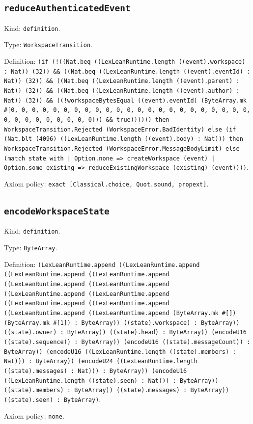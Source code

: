 \documentclass[11pt]{article}
\begin{document}
\subsection*{\texttt{reduceAuthenticatedEvent}}
\noindent Kind: \texttt{definition}.\par
\noindent Type: \texttt{WorkspaceTransition}.\par
\noindent Definition: \texttt{(if (!((Nat.beq ((LexLeanRuntime.length ((event).workspace) : Nat)) (32)) \&\& ((Nat.beq ((LexLeanRuntime.length ((event).eventId) : Nat)) (32)) \&\& ((Nat.beq ((LexLeanRuntime.length ((event).parent) : Nat)) (32)) \&\& ((Nat.beq ((LexLeanRuntime.length ((event).author) : Nat)) (32)) \&\& ((!workspaceBytesEqual ((event).eventId) (ByteArray.mk \#[0, 0, 0, 0, 0, 0, 0, 0, 0, 0, 0, 0, 0, 0, 0, 0, 0, 0, 0, 0, 0, 0, 0, 0, 0, 0, 0, 0, 0, 0, 0, 0])) \&\& true)))))) then WorkspaceTransition.Rejected (WorkspaceError.BadIdentity) else (if (Nat.blt (4096) ((LexLeanRuntime.length ((event).body) : Nat))) then WorkspaceTransition.Rejected (WorkspaceError.MessageBodyLimit) else (match state with | Option.none => createWorkspace (event) | Option.some existing => reduceExistingWorkspace (existing) (event))))}.\par
\noindent Axiom policy: \texttt{exact [Classical.choice, Quot.sound, propext]}.\par
\subsection*{\texttt{encodeWorkspaceState}}
\noindent Kind: \texttt{definition}.\par
\noindent Type: \texttt{ByteArray}.\par
\noindent Definition: \texttt{(LexLeanRuntime.append ((LexLeanRuntime.append ((LexLeanRuntime.append ((LexLeanRuntime.append ((LexLeanRuntime.append ((LexLeanRuntime.append ((LexLeanRuntime.append ((LexLeanRuntime.append ((LexLeanRuntime.append ((LexLeanRuntime.append ((LexLeanRuntime.append ((LexLeanRuntime.append (ByteArray.mk \#[]) (ByteArray.mk \#[1]) : ByteArray)) ((state).workspace) : ByteArray)) ((state).owner) : ByteArray)) ((state).head) : ByteArray)) (encodeU16 ((state).sequence)) : ByteArray)) (encodeU16 ((state).messageCount)) : ByteArray)) (encodeU16 ((LexLeanRuntime.length ((state).members) : Nat))) : ByteArray)) (encodeU24 ((LexLeanRuntime.length ((state).messages) : Nat))) : ByteArray)) (encodeU16 ((LexLeanRuntime.length ((state).seen) : Nat))) : ByteArray)) ((state).members) : ByteArray)) ((state).messages) : ByteArray)) ((state).seen) : ByteArray)}.\par
\noindent Axiom policy: \texttt{none}.\par
\end{document}
